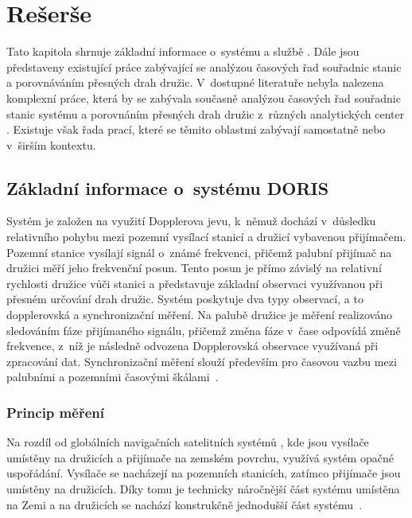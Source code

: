 \chapter{Rešerše}
\label{2-reserse}

Tato kapitola shrnuje základní informace o~systému  a službě . Dále jsou představeny existující práce zabývající se analýzou časových řad souřadnic stanic a porovnáváním přesných drah družic. V~dostupné literatuře nebyla nalezena komplexní práce, která by se zabývala současně analýzou časových řad souřadnic stanic systému  a porovnáním přesných drah družic z~různých analytických center . Existuje však řada prací, které se těmito oblastmi zabývají samostatně nebo v~širším kontextu.

\section{Základní informace o~systému DORIS}

Systém  je založen na využití Dopplerova jevu, k~němuž dochází v~důsledku relativního pohybu mezi pozemní vysílací stanicí a družicí vybavenou přijímačem. Pozemní stanice vysílají signál o~známé frekvenci, přičemž palubní přijímač na družici měří jeho frekvenční posun. Tento posun je přímo závislý na relativní rychlosti družice vůči stanici a představuje základní observaci využívanou při přesném určování drah družic. Systém  poskytuje dva typy observací, a to dopplerovská a synchronizační měření. Na palubě družice je měření realizováno sledováním fáze přijímaného signálu, přičemž změna fáze v~čase odpovídá změně frekvence, z~níž je následně odvozena Dopplerovská observace využívaná při zpracování dat. Synchronizační měření slouží především pro časovou vazbu mezi palubními a pozemními časovými škálami~\cite{ids_what_is_doris}.

\subsection{Princip měření}

Na rozdíl od globálních navigačních satelitních systémů , kde jsou vysílače umístěny na družicích a přijímače na zemském povrchu, využívá systém  opačné uspořádání. Vysílače se nacházejí na pozemních stanicích, zatímco přijímače jsou umístěny na družicích. Díky tomu je technicky náročnější část systému umístěna na Zemi a na družicích se nachází konstrukčně jednodušší část systému~\cite{ids_what_is_doris}.

